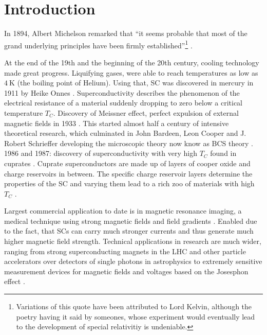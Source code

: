 \documentclass[../notes.tex]{subfiles}
\begin{document}
	
\chapter{Introduction}

In 1894, Albert Michelson remarked that \enquote{it seems probable that most of the grand underlying principles have been firmly established}\footnote{Variations of this quote have been attributed to Lord Kelvin, although the poetry having it said by someones, whose experiment would eventually lead to the development of special relativitiy is undeniable.}  \cite[p. 159]{chicagoAnnualRegister1896}.


At the end of the 19th and the beginning of the 20th century, cooling technology made great progress.
Liquifying gases, were able to reach temperatures as low as \(\qty{4}{\kelvin}\) (the boiling point of Helium).
Using that, SC was discovered in mercury in 1911 by Heike Onnes \cite{onnesFurtherExperimentsLiquid1991}.
Superconductivity describes the phenomenon of the electrical resistance of a material suddenly dropping to zero below a critical temperature \(T_C\).
Discovery of Meissner effect, perfect expulsion of external magnetic fields in 1933 \cite{meissnerNeuerEffektBei1933}.
This started almost half a century of intensive theoretical research, which culminated in John Bardeen, Leon Cooper and J. Robert Schrieffer developing the microscopic theory now know as BCS theory \cite{bardeenTheorySuperconductivity1957}.
1986 and 1987: discovery of superconductivity with very high \(T_C\) found in cuprates \cite{bednorzPossibleHighTc1986,uchidaHighTcSuperconductivity1987}.
Cuprate superconductors are made up of layers of cooper oxide and charge reservoirs in between.
The specific charge reservoir layers determine the properties of the SC and varying them lead to a rich zoo of materials with high \(T_C\)  \cite{rybickiPerspectivePhaseDiagram2016}.

Largest commercial application to date is in magnetic resonance imaging, a medical technique using strong magnetic fields and field gradients \cite{rinckMagneticResonanceMedicine}.
Enabled due to the fact, that SCs can carry much stronger currents and thus generate much higher magnetic field strength.
Technical applications in research are much wider, ranging from strong superconducting magnets in the LHC \cite{tollestrupDevelopmentSuperconductingMagnets2008} and other particle accelerators over detectors of single photons in astrophysics \cite{irwinTransitionEdgeSensors2005} to extremely sensitive measurement devices for magnetic fields \cite{faleyHighTcSQUIDBiomagnetometers2017} and voltages \cite{klushinPresentFutureHightemperature2020} based on the Josesphon effect \cite{josephsonPossibleNewEffects1962}.
\end{document}
